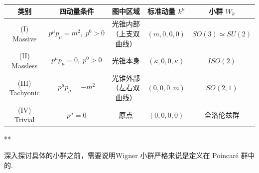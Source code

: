 \begin{center}
            \renewcommand{\arraystretch}{1.8}\label{2}
            \begin{tabular}{|c|c|c|c|c|}
            \hline
            类别
            & 四动量条件
            & 图中区域
            & 标准动量 $k^\mu$
            & 小群 $W_k$ \\ \hline

            (I) Massive
            & $p^\mu p_\mu=m^2,\; p^0>0$
            & 光锥内部（上支双曲线）
            & $(m,0,0,0)$
            & $SO(3)\simeq SU(2)$ \\ \hline

            (II) Massless
            & $p^\mu p_\mu=0,\; p^0>0$
            & 光锥本身
            & $(\kappa,0,0,\kappa)$
            & $ISO(2)$ \\ \hline

            (III) Tachyonic
            & $p^\mu p_\mu=-m^2$
            & 光锥外部（左右双曲线）
            & $(0,0,0,m)$
            & $SO(2,1)$ \\ \hline

            (IV) Trivial
            & $p^\mu=0$
            & 原点
            & $(0,0,0,0)$
            & 全洛伦兹群 \\ \hline

            \end{tabular}
\end{center}
\begin{center}
    \vspace{2ex}
\Large ***
\vspace{1ex}
\end{center}
深入探讨具体的小群之前，需要说明Wigner 小群严格来说是定义在 Poincaré 群中的.

